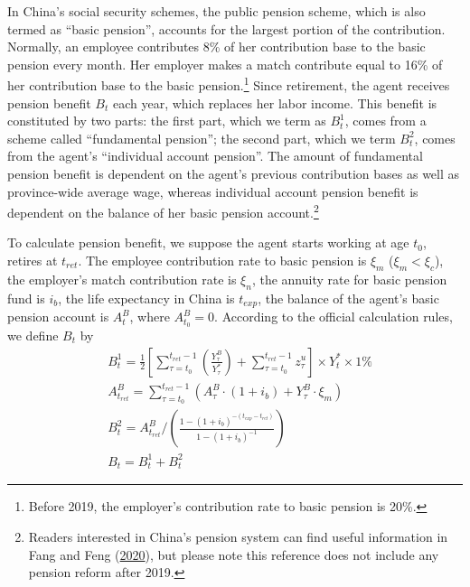 \documentclass[
  12pt,
]{article}
\begin{document}
In China's social security schemes, the public pension scheme, which is
also termed as ``basic pension'', accounts for the largest portion of
the contribution. Normally, an employee contributes 8\% of her
contribution base to the basic pension every month. Her employer makes a
match contribute equal to 16\% of her contribution base to the basic
pension.\footnote{Before 2019, the employer's contribution rate to basic
  pension is 20\%.} Since retirement, the agent receives pension benefit
\(B_t\) each year, which replaces her labor income. This benefit is
constituted by two parts: the first part, which we term as \(B^1_t\),
comes from a scheme called ``fundamental pension''; the second part,
which we term \(B^2_t\), comes from the agent's ``individual account
pension''. The amount of fundamental pension benefit is dependent on the
agent's previous contribution bases as well as province-wide average
wage, whereas individual account pension benefit is dependent on the
balance of her basic pension account.\footnote{Readers interested in
  China's pension system can find useful information in Fang and Feng
  (\protect\hyperlink{ref-fang_chinese_2020}{2020}), but please note
  this reference does not include any pension reform after 2019.}

To calculate pension benefit, we suppose the agent starts working at age
\(t_0\), retires at \(t_{ret}\). The employee contribution rate to basic
pension is \(\xi_m\) (\(\xi_m<\xi_c\)), the employer's match
contribution rate is \(\xi_n\), the annuity rate for basic pension fund
is \(i_b\), the life expectancy in China is \(t_{exp}\), the balance of
the agent's basic pension account is \(A^B_t\), where \(A^B_{t_0}=0\).
According to the official calculation rules, we define \(B_t\) by
\begin{equation}
\label{eq:pension}
\begin{aligned}
& B^1_t = \frac{1}{2}\left[\sum_{\tau=t_0}^{t_{ret}-1}\left(\frac{Y^B_\tau}{Y^*_\tau}\right) + \sum_{\tau=t_0}^{t_{ret}-1}z^u_{\tau}\right]\times Y^*_t\times1\% \\
& A^B_{t_{ret}}=\sum_{\tau=t_0}^{t_{ret}-1}
\left( A^B_\tau\cdot (1+i_b)+Y^B_\tau \cdot \xi_m\right) \\
& B^2_t =A^B_{t_{ret}} / 
\left(\frac{1-(1+i_b)^{-(t_{exp}-t_{ret})}}{1-(1+i_b)^{-1}}\right) \\
& B_t = B^1_t + B^2_t
\end{aligned}
\end{equation}
\end{document}
